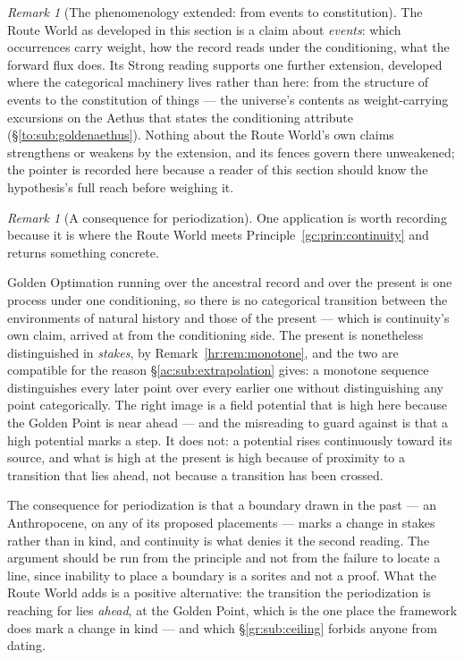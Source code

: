 \documentclass[11pt]{article}
\numberwithin{equation}{section}
\theoremstyle{plain}
\theoremstyle{definition}
\theoremstyle{remark}
\newtheorem{remark}[theorem]{Remark}
\begin{document}
\begin{remark}[The phenomenology extended: from events to constitution]
\label{gc:rem:constitution}
The Route World as developed in this section is a claim about
\emph{events}: which occurrences carry weight, how the record reads
under the conditioning, what the forward flux does. Its Strong reading
supports one further extension, developed where the categorical
machinery lives rather than here: from the structure of events to the
constitution of things --- the universe's contents as
weight-carrying excursions on the Aethus that states the conditioning
attribute (\S\ref{to:sub:goldenaethus}). Nothing about the Route
World's own claims strengthens or weakens by the extension, and its
fences govern there unweakened; the pointer is recorded here because a
reader of this section should know the hypothesis's full reach before
weighing it.
\end{remark}

\begin{remark}[A consequence for periodization]\label{gc:rem:periodization}
One application is worth recording because it is where the Route World
meets Principle~\ref{gc:prin:continuity} and returns something concrete.

Golden Optimation running over the ancestral record and over the present
is one process under one conditioning, so there is no categorical
transition between the environments of natural history and those of the
present --- which is continuity's own claim, arrived at from the
conditioning side. The present is nonetheless distinguished in
\emph{stakes}, by Remark~\ref{hr:rem:monotone}, and the two are
compatible for the reason \S\ref{ac:sub:extrapolation} gives: a
monotone sequence distinguishes every later point over every earlier one
without distinguishing any point categorically. The right image is a
field potential that is high here because the Golden Point is near ahead
--- and the misreading to guard against is that a high potential marks a
step. It does not: a potential rises continuously toward its source, and
what is high at the present is high because of proximity to a transition
that lies ahead, not because a transition has been crossed.

The consequence for periodization is that a boundary drawn in the past
--- an Anthropocene, on any of its proposed placements --- marks a
change in stakes rather than in kind, and continuity is what denies it
the second reading. The argument should be run from the principle and
not from the failure to locate a line, since inability to place a
boundary is a sorites and not a proof. What the Route World adds is a
positive alternative: the transition the periodization is reaching for
lies \emph{ahead}, at the Golden Point, which is the one place the
framework does mark a change in kind --- and which
\S\ref{gr:sub:ceiling} forbids anyone from dating.
\end{remark}
\end{document}
